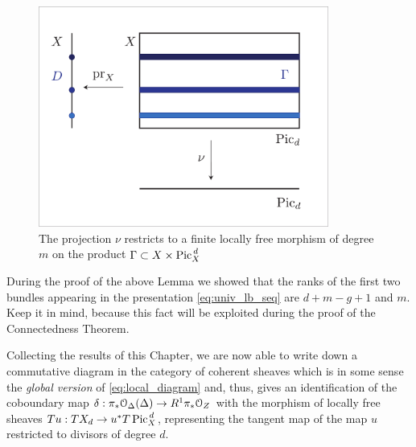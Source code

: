 		\begin{figure}[ht]
				\centering
				\includegraphics[width=0.85\textwidth]{Locally-free-of-degree-m.pdf}
				\caption{The projection $\nu$ restricts to a finite locally free morphism of degree $m$ on the product $\Gamma\subset X\times \operatorname{Pic}^{\,d}_X$ }
				\label{fig:locally_free_morphism}
		\end{figure}
		
		\begin{rema}\label{rema:ranks}
			During the proof of the above Lemma we showed that the ranks of the first two bundles appearing in the presentation \eqref{eq:univ_lb_seq} are $d+m-g+1$ and $m$. Keep it in mind, because this fact will be exploited during the proof of the Connectedness Theorem.
		\end{rema}

		Collecting the results of this Chapter, we are now able to write down a commutative diagram in the category of coherent sheaves which is in some sense the \emph{global version} of \eqref{eq:local_diagram} and, thus, gives an identification of the coboundary map $\delta:\pi_* \mathcal{O}_\Delta(\Delta)\to R^1\pi_*\mathcal{O}_Z$ with the morphism of locally free sheaves $Tu:T X_d\to u^* T \operatorname{Pic}^{\,d}_X$, representing the tangent map of the \AJJ map $u$ restricted to divisors of degree $d$.

